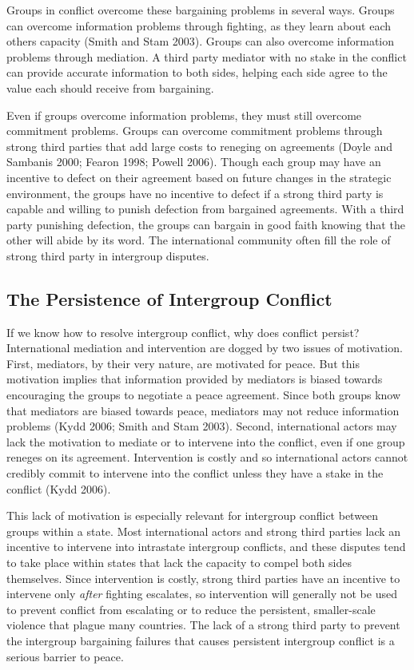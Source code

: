 \documentclass[11pt]{article}
\begin{document}
Groups in conflict overcome these bargaining problems in several ways.
Groups can overcome information problems through fighting, as they learn
about each others capacity (Smith and Stam 2003). Groups can also
overcome information problems through mediation. A third party mediator
with no stake in the conflict can provide accurate information to both
sides, helping each side agree to the value each should receive from
bargaining.

Even if groups overcome information problems, they must still overcome
commitment problems. Groups can overcome commitment problems through
strong third parties that add large costs to reneging on agreements
(Doyle and Sambanis 2000; Fearon 1998; Powell 2006). Though each group
may have an incentive to defect on their agreement based on future
changes in the strategic environment, the groups have no incentive to
defect if a strong third party is capable and willing to punish
defection from bargained agreements. With a third party punishing
defection, the groups can bargain in good faith knowing that the other
will abide by its word. The international community often fill the role
of strong third party in intergroup disputes.

\subsection{The Persistence of Intergroup
Conflict}\label{the-persistence-of-intergroup-conflict}

If we know how to resolve intergroup conflict, why does conflict
persist? International mediation and intervention are dogged by two
issues of motivation. First, mediators, by their very nature, are
motivated for peace. But this motivation implies that information
provided by mediators is biased towards encouraging the groups to
negotiate a peace agreement. Since both groups know that mediators are
biased towards peace, mediators may not reduce information problems
(Kydd 2006; Smith and Stam 2003). Second, international actors may lack
the motivation to mediate or to intervene into the conflict, even if one
group reneges on its agreement. Intervention is costly and so
international actors cannot credibly commit to intervene into the
conflict unless they have a stake in the conflict (Kydd 2006).

This lack of motivation is especially relevant for intergroup conflict
between groups within a state. Most international actors and strong
third parties lack an incentive to intervene into intrastate intergroup
conflicts, and these disputes tend to take place within states that lack
the capacity to compel both sides themselves. Since intervention is
costly, strong third parties have an incentive to intervene only
\emph{after} fighting escalates, so intervention will generally not be
used to prevent conflict from escalating or to reduce the persistent,
smaller-scale violence that plague many countries. The lack of a strong
third party to prevent the intergroup bargaining failures that causes
persistent intergroup conflict is a serious barrier to peace.
\end{document}
